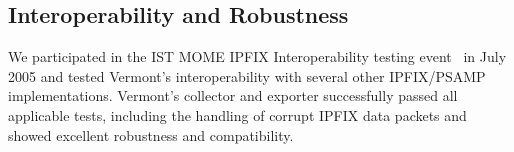 \subsection{Interoperability and Robustness}

We participated in the IST MOME IPFIX Interoperability testing event~\cite{mome-interop} in July 2005 and tested Vermont's interoperability with several other IPFIX/PSAMP implementations. 
Vermont's collector and exporter successfully passed all applicable tests, including the handling of corrupt IPFIX data packets and showed excellent robustness and compatibility.

